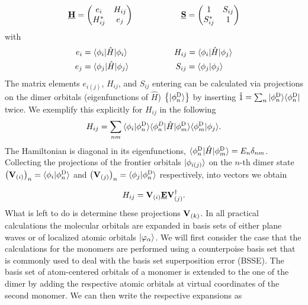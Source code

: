 %
\begin{equation}
  \underline{\mathbf{H}} = 
  \begin{pmatrix}
    e_i    &  H_{ij} \\
    H_{ij}^* &  e_j  
  \end{pmatrix} \hspace{2cm}
  \underline{\mathbf{S}} = 
  \begin{pmatrix}
    1    &  S_{ij} \\
    S_{ij}^* &  1  
  \end{pmatrix}
  \label{equ:dipro_eq3}
\end{equation}
%
with 
%
\begin{equation}
 \begin{aligned}
  e_i &= \bra{\phi_i}\oper{H} \ket{\phi_i} \hspace{2cm}  H_{ij} = 
\bra{\phi_i}\oper{H} \ket{\phi_j}\\
  e_j &= \bra{\phi_j}\oper{H} \ket{\phi_j} \hspace{2cm}  S_{ij} = \bra{\phi_j} 
\phi_j\rangle %
 \end{aligned}
  \label{equ:dipro_eq4}
\end{equation}
The matrix elements $e_{i(j)}$, $H_{ij}$, and $S_{ij}$ entering  
can be calculated via projections on the dimer orbitals (eigenfunctions of 
$\hat{H}$) $\left\{{\vert \phi^\text{D}_n \rangle}\right\}$ by inserting $\hat{1} = 
\sum_n {\vert \phi^\text{D}_n \rangle}{\langle \phi^\text{D}_n \vert}$ twice. We exemplify this 
explicitly for $H_{ij}$ in the following
%
\begin{equation}
  H_{ij} = \sum_{nm}{{\langle \phi_i \vert \phi^\text{D}_n \rangle} 
{\langle \phi^{D}_n \vert}\hat{H}{\vert \phi^\text{D}_m \rangle}{\langle \phi^\text{D}_m \vert \phi_j \rangle}} .
  \label{eq:dipro_eq16}
\end{equation}
%
The Hamiltonian is diagonal in its eigenfunctions, 
${\langle \phi^\text{D}_n \vert}\hat{H}{\vert \phi^\text{D}_m \rangle} = E_n \delta_{nm}$. 
Collecting the projections of the frontier orbitals  ${\vert \phi_{i(j)} \rangle}$ on the 
$n$-th dimer state $\left({\mathbf{V}}_{(i)}\right)_n= 
{\langle \phi_i \vert \phi^\text{D}_n \rangle}$ and 
$\left({\mathbf{V}}_{(j)}\right)_n={\langle \phi_j \vert \phi^\text{D}_n \rangle}$ respectively, 
into vectors we obtain

\begin{equation}
   H_{ij} = {\mathbf{V}}_{(i)} \underline{\mathbf{E}}   {\mathbf{V}}_{(j)}^\dagger .
  \label{eq:dipro_eq17}
\end{equation}
%
What is left to do is determine these projections ${\mathbf{V}}_{(k)}$. In all 
practical calculations the molecular orbitals are expanded in basis sets of 
either plane waves or of localized atomic orbitals ${\vert \varphi_\alpha \rangle}$. We 
will first consider the case that the calculations for
the monomers are performed using a counterpoise basis set that is commonly used 
to deal with the basis set superposition error (BSSE). The basis set of 
atom-centered orbitals of a monomer is extended to the one of the dimer by 
adding the respective atomic orbitals at virtual coordinates of the second 
monomer. We can then write the respective expansions as

